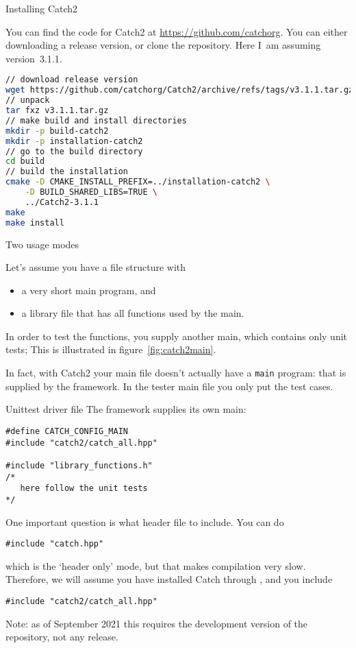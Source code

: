  {Installing Catch2}


You can find the code for Catch2 at \url{https://github.com/catchorg}.
You can either downloading a release version, or clone the repository.
Here I~am assuming version~3.1.1.

\begin{lstlisting}[language=bash]
// download release version
wget https://github.com/catchorg/Catch2/archive/refs/tags/v3.1.1.tar.gz
// unpack
tar fxz v3.1.1.tar.gz
// make build and install directories
mkdir -p build-catch2
mkdir -p installation-catch2
// go to the build directory
cd build
// build the installation
cmake -D CMAKE_INSTALL_PREFIX=../installation-catch2 \
    -D BUILD_SHARED_LIBS=TRUE \
    ../Catch2-3.1.1
make
make install
\end{lstlisting}


 {Two usage modes}

Let's assume you have a file structure with
\begin{itemize}
\item a very short main program, and
\item a library file that has all functions used by the main.
\end{itemize}
In order to test the functions, you supply another main,
which contains only unit tests;  
This is illustrated in figure~\ref{fig:catch2main}.

In fact, with Catch2 your main file doesn't actually have
a \lstinline{main} program: that is supplied by the framework.
In the tester main file you only put the test cases.

\begin{block}{Unittest driver file}
  \label{sl:catch2main}
The framework supplies its own main:
\begin{lstlisting}
#define CATCH_CONFIG_MAIN
#include "catch2/catch_all.hpp"

#include "library_functions.h"
/*
   here follow the unit tests
*/
\end{lstlisting}
\end{block}

One important question is what header file to include.
You can do 
\begin{lstlisting}
#include "catch.hpp"
\end{lstlisting}
which is the `header only' mode,
but that makes compilation very slow.
Therefore, we will assume you have installed Catch through ,
and you include
\begin{lstlisting}
#include "catch2/catch_all.hpp"
\end{lstlisting}
Note: as of September 2021 this requires the development version of the repository,
not any \n{2.x} release.

